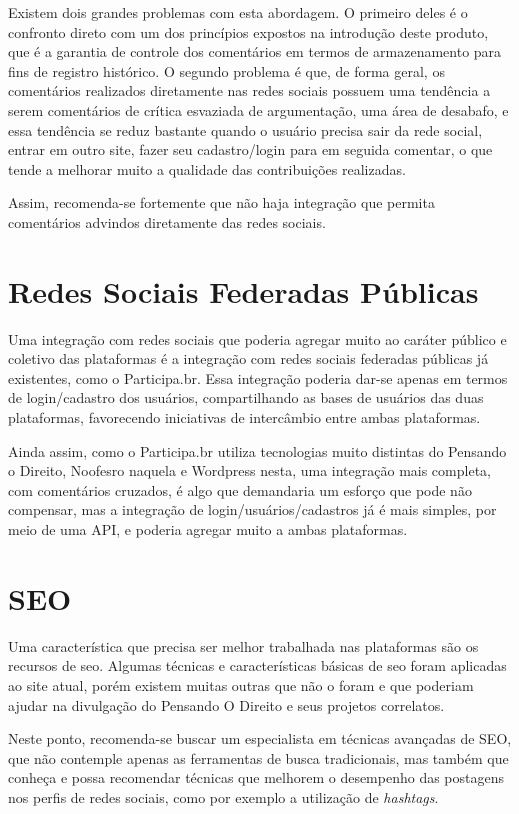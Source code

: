 Existem dois grandes problemas com esta abordagem. O primeiro deles é o confronto direto com um dos princípios expostos na introdução deste produto, que é a garantia de controle dos comentários em termos de armazenamento para fins de registro histórico. O segundo problema é que, de forma geral, os comentários realizados diretamente nas redes sociais possuem uma tendência a serem comentários de crítica esvaziada de argumentação, uma área de desabafo, e essa tendência se reduz bastante quando o usuário precisa sair da rede social, entrar em outro site, fazer seu cadastro/login para em seguida comentar, o que tende a melhorar muito a qualidade das contribuições realizadas.

Assim, recomenda-se fortemente que não haja integração que permita comentários advindos diretamente das redes sociais.

\section{Redes Sociais Federadas Públicas}
Uma integração com redes sociais que poderia agregar muito ao caráter público e coletivo das plataformas é a integração com redes sociais federadas públicas já existentes, como o Participa.br. Essa integração poderia dar-se apenas em termos de login/cadastro dos usuários, compartilhando as bases de usuários das duas plataformas, favorecendo iniciativas de intercâmbio entre ambas plataformas.

Ainda assim, como o Participa.br utiliza tecnologias muito distintas do Pensando o Direito, Noofesro naquela e Wordpress nesta, uma integração mais completa, com comentários cruzados, é algo que demandaria um esforço que pode não compensar, mas a integração de login/usuários/cadastros já é mais simples, por meio de uma API, e poderia agregar muito a ambas plataformas.

\section{SEO}
Uma característica que precisa ser melhor trabalhada nas plataformas são os recursos de \gls{seo}. Algumas técnicas e características básicas de \gls{seo} foram aplicadas ao site atual, porém existem muitas outras que não o foram e que poderiam ajudar na divulgação do Pensando O Direito e seus projetos correlatos.

Neste ponto, recomenda-se buscar um especialista em técnicas avançadas de SEO, que não contemple apenas as ferramentas de busca tradicionais, mas também que conheça e possa recomendar técnicas que melhorem o desempenho das postagens nos perfis de redes sociais, como por exemplo a utilização de \textit{hashtags}.

